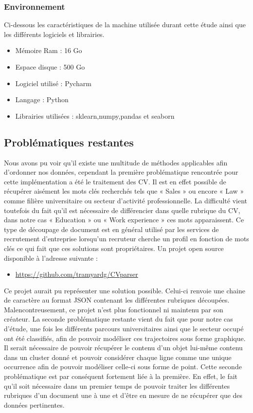 \documentclass[memoire.tex]{subfiles}
\begin{document}
\subsubsection{Environnement}
Ci-dessous les caractéristiques de la machine utilisée durant cette étude ainsi que les différents logiciels et librairies.
\begin{itemize}
\item Mémoire Ram : 16 Go
\item Espace disque : 500 Go
\item Logiciel utilisé : Pycharm
\item Langage : Python
\item Librairies utilisées : sklearn,numpy,pandas et seaborn
\end{itemize}
\newpage
\subsection{Problématiques restantes}
Nous avons pu voir qu’il existe une multitude de méthodes applicables afin d’ordonner nos données, cependant la première problématique rencontrée pour cette implémentation a été le traitement des CV. Il est en effet possible de récupérer aisément les mots clés recherchés tels que « Sales » ou encore « Law » comme filière universitaire ou secteur d’activité professionnelle. La difficulté vient toutefois du fait qu’il est nécessaire de différencier dans quelle rubrique du CV, dans notre cas « Education » ou « Work experience » ces mots apparaissent. Ce type de découpage de document est en général utilisé par les services de recrutement d’entreprise lorsqu’un recruteur cherche un profil en fonction de mots clés ce qui fait que ces solutions sont propriétaires. Un projet open source disponible à l’adresse suivante :
\begin{itemize}
\item \url{https://github.com/tramyardg/CVparser}
\end{itemize}

Ce projet aurait pu représenter une solution possible. Celui-ci renvoie une chaine de caractère au format JSON contenant les différentes rubriques découpées. Malencontreusement, ce projet n’est plus fonctionnel ni maintenu par son créateur. 
La seconde problématique restante vient du fait que pour notre cas d’étude, une fois les différents parcours universitaires ainsi que le secteur occupé ont été classifiés, afin de pouvoir modéliser ces trajectoires sous forme graphique. Il serait nécessaire de pouvoir récupérer le contenu d’un objet lui-même contenu dans un cluster donné et pouvoir considérer chaque ligne comme une unique occurrence afin de pouvoir modéliser celle-ci sous forme de point. Cette seconde problématique est par conséquent fortement liée à la première. En effet, le fait qu’il soit nécessaire dans un premier temps de pouvoir traiter les différentes rubriques d’un document une à une et d’être en mesure de ne récupérer que des données pertinentes. 
\newpage
\end{document}
